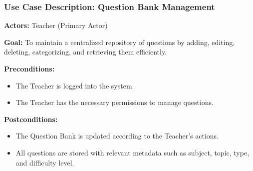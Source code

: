 \documentclass[12pt]{article}
\begin{document}
	\begin{center}
	\end{center}
	
	\subsubsection*{Use Case Description: Question Bank Management}
	
	\textbf{Actors:} Teacher (Primary Actor)
	
	\textbf{Goal:}  
	To maintain a centralized repository of questions by adding, editing, deleting, categorizing, and retrieving them efficiently.
	
	\textbf{Preconditions:}
	\begin{itemize}
		\item The Teacher is logged into the system.
		\item The Teacher has the necessary permissions to manage questions.
	\end{itemize}
	
	\textbf{Postconditions:}
	\begin{itemize}
		\item The Question Bank is updated according to the Teacher’s actions.
		\item All questions are stored with relevant metadata such as subject, topic, type, and difficulty level.
	\end{itemize}
	
\end{document}
